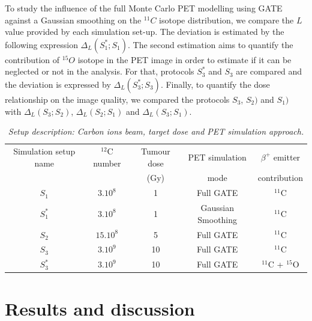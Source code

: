 \documentclass[11pt]{iopart}
\begin{document}
To study the influence of the full Monte Carlo PET modelling using GATE against a Gaussian smoothing on the $^{11}C$ isotope distribution, we compare the $L$ value provided by each simulation set-up. 
The deviation is estimated by the following expression $\Delta_{L}(S_{1}^{*};S_{1})$. The second estimation aims to quantify the contribution of $^{15}O$ isotope in the PET image in order to estimate if it can be neglected or not in the analysis. For that, protocols $S_{3}^{*}$ and $S_{3}$ are compared and the deviation is expressed by $\Delta_{L}(S_{3}^{*};S_{3})$. 
Finally, to quantify the dose relationship on the image quality, we compared the protocols $S_{3}$, $S_{2})$ and $S_{1})$ with $\Delta_{L}(S_{3};S_{2})$, $\Delta_{L}(S_{2};S_{1})$ and $\Delta_{L}(S_{3};S_{1})$.
 
\begin{table}[htbp]
\begin{center}
\begin{tabular}{|c|c|c|c|c|} \hline
Simulation setup name  & $^{12}$C number  & Tumour dose   & PET simulation  & $\beta^{+}$ emitter  \\
                      &                & (Gy)  & mode & contribution \\\hline \hline

$S_{1}$    & $3.10^{8}$             & 1                     & Full GATE           &           $^{11}$C      \\ \hline
$S_{1}^{*}$    & $3.10^{8}$         & 1                     & Gaussian Smoothing  &      $^{11}$C           \\ \hline
$S_{2}$    & $15.10^{8}$            & 5                     & Full GATE           &       $^{11}$C          \\ \hline
$S_{3}$    & $3.10^{9}$             & 10                    & Full GATE           &           $^{11}$C      \\ \hline
$S_{3}^{*}$ & $3.10^{9}$            & 10                    & Full GATE           &  $^{11}$C + $^{15}$O    \\ \hline \hline 
\end{tabular}
\end{center} 
\caption{\it Setup description: Carbon ions beam, target dose and PET simulation approach.}
\label{tab:setup}
\end{table}

\section{Results and discussion}
\end{document}
